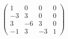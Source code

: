 \documentclass[preview]{standalone}
\begin{document}
\begin{align*}
\begin{pmatrix} 1 & 0 & 0 & 0 \\ -3 & 3 & 0 & 0 \\ 3 & -6 & 3 & 0 \\ -1 & 3 & -3 & 1 \end{pmatrix}
\end{align*}
\end{document}
